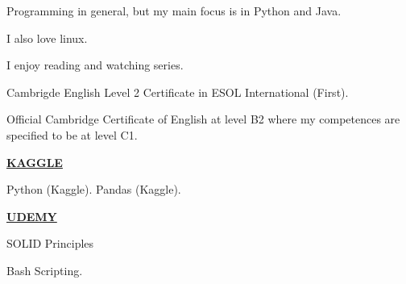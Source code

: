 








Programming in general, but my main focus is in Python and Java.

I also love linux. 

I enjoy reading and watching series.

{ \faCertificate \color{emphasis} \hspace{2mm} Cambrigde English Level 2 Certificate in ESOL International (First).}

Official Cambridge Certificate of English at level B2 where my competences are specified to be at level C1.

\underline{\textbf{KAGGLE}}

{\faCertificate \color{emphasis} \hspace{2mm} Python (Kaggle).}
{\faCertificate \color{emphasis} \hspace{2mm} Pandas (Kaggle).}

\underline{\textbf{UDEMY}}

{\faCertificate \color{emphasis} \hspace{2mm} SOLID Principles}

{\faCertificate \color{emphasis} \hspace{2mm} Bash Scripting.}

